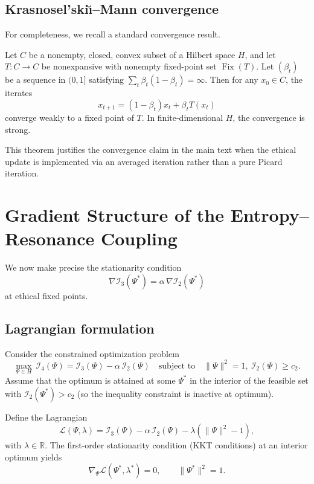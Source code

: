 \documentclass[11pt]{article}
\begin{document}
\subsection{Krasnosel'ski\u{\i}--Mann convergence}

For completeness, we recall a standard convergence result.

\begin{theorem}
Let $C$ be a nonempty, closed, convex subset of a Hilbert space $H$, and let $T:C\to C$ be nonexpansive with nonempty fixed-point set $\operatorname{Fix}(T)$. Let $(\beta_t)$ be a sequence in $(0,1]$ satisfying $\sum_t \beta_t(1-\beta_t)=\infty$. Then for any $x_0\in C$, the iterates
\[
  x_{t+1} = (1-\beta_t)x_t + \beta_t T(x_t)
\]
converge weakly to a fixed point of $T$. In finite-dimensional $H$, the convergence is strong.
\end{theorem}

This theorem justifies the convergence claim in the main text when the ethical update is implemented via an averaged iteration rather than a pure Picard iteration.

\section{Gradient Structure of the Entropy--Resonance Coupling}

We now make precise the stationarity condition
\[
  \nabla\mathcal{I}_3(\Psi^*) = \alpha\,\nabla\mathcal{I}_2(\Psi^*)
\]
at ethical fixed points.

\subsection{Lagrangian formulation}

Consider the constrained optimization problem
\begin{equation}
  \max_{\Psi\in H}\ \mathcal{I}_4(\Psi) = \mathcal{I}_3(\Psi) - \alpha\,\mathcal{I}_2(\Psi)
  \quad\text{subject to}\quad \|\Psi\|^2 = 1,\ \mathcal{I}_2(\Psi)\ge c_2.
  \label{eq:opt-I4}
\end{equation}
Assume that the optimum is attained at some $\Psi^*$ in the interior of the feasible set
with $\mathcal{I}_2(\Psi^*)>c_2$ (so the inequality constraint is inactive at optimum).

Define the Lagrangian
\[
  \mathcal{L}(\Psi,\lambda) 
  = \mathcal{I}_3(\Psi) - \alpha\,\mathcal{I}_2(\Psi) 
    - \lambda(\|\Psi\|^2 - 1),
\]
with $\lambda\in\mathbb{R}$. The first-order stationarity condition (KKT conditions) at an interior optimum yields
\[
  \nabla_\Psi \mathcal{L}(\Psi^*,\lambda^*) = 0,\qquad \|\Psi^*\|^2=1.
\]
\end{document}
